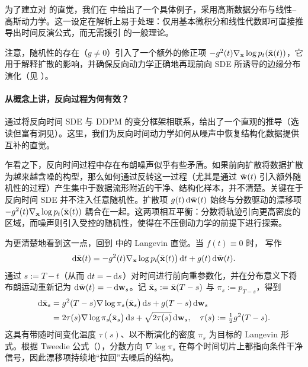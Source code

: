 为了建立对  的直觉，我们在  中给出了一个具体例子，采用高斯数据分布与线性--高斯动力学。这一设定在解析上易于处理：仅用基本微积分和线性代数即可直接推导出时间反演公式，而无需援引 \citet{anderson1982reverse} 的一般理论。

注意，随机性的存在（$g\neq 0$）引入了一个额外的修正项 $ -g^2(t) \nabla_{{\mathbf{x}}} \log p_t(\bar{{\mathbf{x}}}(t))$，它用于解释扩散的影响，并确保反向动力学正确地再现前向 SDE 所诱导的边缘分布演化（见 ）。

\paragraph{从概念上讲，反向过程为何有效？}  通过将反向时间 SDE 与 DDPM 的变分框架相联系，给出了一个直观的推导（选读但富有洞见）。这里，我们为反向时间动力学如何从噪声中恢复结构化数据提供互补的直觉。


乍看之下，反向时间过程中存在布朗噪声似乎有些矛盾。如果前向扩散将数据扩散为越来越含噪的构型，那么如何通过反转这一过程（尤其是通过 $\bar{{\mathbf{w}}}(t)$ 引入额外随机性的过程）产生集中于数据流形附近的干净、结构化样本，并不清楚。关键在于反向时间 SDE 并不注入任意随机性。扩散项 $g(t)\mathop{}\!\mathrm{d}\bar{{\mathbf{w}}}(t)$ 始终与分数驱动的漂移项 $- g^2(t)\nabla_{{\mathbf{x}}}\log p_t(\bar{{\mathbf{x}}}(t))$ 耦合在一起。这两项相互平衡：分数将轨迹引向更高密度的区域，而噪声则引入受控的随机性，使得在不压倒动力学的前提下进行探索。

为更清楚地看到这一点，回到  中的 Langevin 直觉。当 $f(t)\equiv 0$ 时， 写作
\[
\mathop{}\!\mathrm{d}\bar{{\mathbf{x}}}(t)
= - g^2(t) \nabla_{{\mathbf{x}}}\log p_t\!\big(\bar{{\mathbf{x}}}(t)\big) \mathop{}\!\mathrm{d} t
+ g(t)  \mathop{}\!\mathrm{d}\bar{{\mathbf{w}}}(t).
\]
通过 $s:=T-t$（从而 $\mathop{}\!\mathrm{d} t=-\mathop{}\!\mathrm{d} s$）对时间进行前向重参数化，并在分布意义下将布朗运动重新记为 $\mathop{}\!\mathrm{d}\bar{{\mathbf{w}}}(t)=-\mathop{}\!\mathrm{d}{\mathbf{w}}_s$。记 $\bar{{\mathbf{x}}}_s:=\bar{{\mathbf{x}}}(T-s)$ 与 $\pi_s:=p_{T-s}$，得到
\begin{align*}
    \mathop{}\!\mathrm{d}\bar{{\mathbf{x}}}_s
    &= g^2(T-s) \nabla\log \pi_s \big(\bar{{\mathbf{x}}}_s\big) \mathop{}\!\mathrm{d} s
    + g(T-s) \mathop{}\!\mathrm{d}{\mathbf{w}}_s
    \\&=
2\tau(s) \nabla\log \pi_s\!\big(\bar{{\mathbf{x}}}_s\big) \mathop{}\!\mathrm{d} s
    + \sqrt{2\tau(s)} \mathop{}\!\mathrm{d}{\mathbf{w}}_s,
    \quad
    \tau(s):=\tfrac{1}{2}g^2(T-s).
\end{align*}
这具有带随时间变化温度 $\tau(s)$、以不断演化的密度 $\pi_s$ 为目标的 Langevin 形式。根据 Tweedie 公式（），分数方向 $\nabla\log \pi_s$ 在每个时间切片上都指向条件干净信号，因此漂移项持续地``拉回''去噪后的结构。

